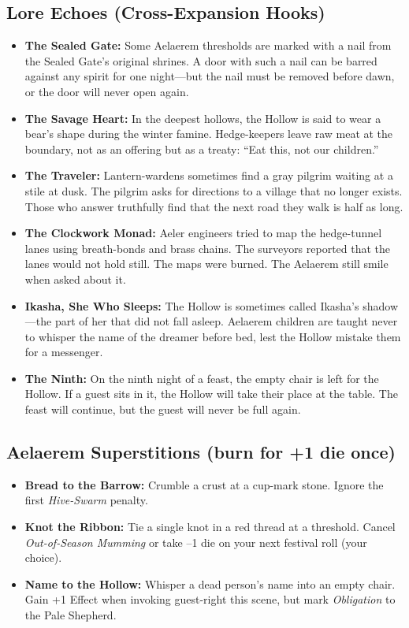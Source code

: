 \subsection*{Lore Echoes (Cross-Expansion Hooks)}
\begin{itemize}
  \item \textbf{The Sealed Gate:} Some Aelaerem thresholds are marked with a nail from the Sealed Gate's original shrines. A door with such a nail can be barred against any spirit for one night---but the nail must be removed before dawn, or the door will never open again.
  \item \textbf{The Savage Heart:} In the deepest hollows, the Hollow is said to wear a bear's shape during the winter famine. Hedge-keepers leave raw meat at the boundary, not as an offering but as a treaty: ``Eat this, not our children.''
  \item \textbf{The Traveler:} Lantern-wardens sometimes find a gray pilgrim waiting at a stile at dusk. The pilgrim asks for directions to a village that no longer exists. Those who answer truthfully find that the next road they walk is half as long.
  \item \textbf{The Clockwork Monad:} Aeler engineers tried to map the hedge-tunnel lanes using breath-bonds and brass chains. The surveyors reported that the lanes would not hold still. The maps were burned. The Aelaerem still smile when asked about it.
  \item \textbf{Ikasha, She Who Sleeps:} The Hollow is sometimes called Ikasha's shadow---the part of her that did not fall asleep. Aelaerem children are taught never to whisper the name of the dreamer before bed, lest the Hollow mistake them for a messenger.
  \item \textbf{The Ninth:} On the ninth night of a feast, the empty chair is left for the Hollow. If a guest sits in it, the Hollow will take their place at the table. The feast will continue, but the guest will never be full again.
\end{itemize}

\subsection*{Aelaerem Superstitions (burn for +1 die once)}
\begin{itemize}
  \item \textbf{Bread to the Barrow:} Crumble a crust at a cup-mark stone. Ignore the first \emph{Hive-Swarm} penalty.
  \item \textbf{Knot the Ribbon:} Tie a single knot in a red thread at a threshold. Cancel \emph{Out-of-Season Mumming} or take --1 die on your next festival roll (your choice).
  \item \textbf{Name to the Hollow:} Whisper a dead person's name into an empty chair. Gain +1 Effect when invoking guest-right this scene, but mark \emph{Obligation} to the Pale Shepherd.
\end{itemize}

